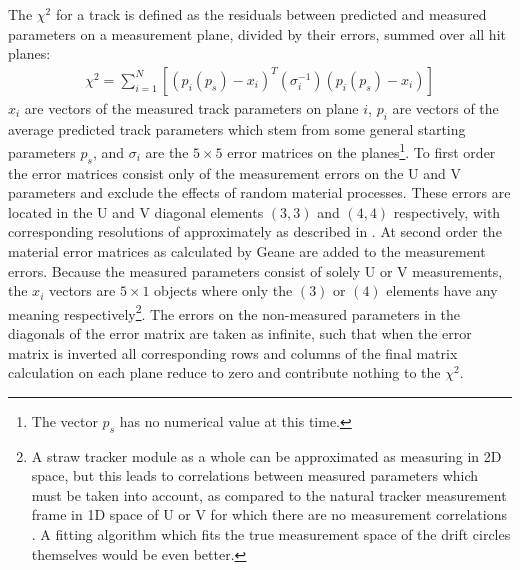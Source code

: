 The $\chi^{2}$ for a track is defined as the residuals between predicted and measured parameters on a measurement plane, divided by their errors, summed over all hit planes:
    \begin{align} \label{eq:chi2sum}
        \chi^2 = \sum_{i=1}^{N} [(p_{i}(p_{s})-x_{i})^{T} (\sigma_{i}^{-1}) (p_{i}(p_{s})-x_{i})]
    \end{align}
$x_{i}$ are vectors of the measured track parameters on plane $i$, $p_{i}$ are vectors of the average predicted track parameters which stem from some general starting parameters $p_{s}$, and $\sigma_{i}$ are the $5 \times 5$ error matrices on the planes\footnote{The vector $p_{s}$ has no numerical value at this time.}. To first order the error matrices consist only of the measurement errors on the U and V parameters and exclude the effects of random material processes. These errors are located in the U and V diagonal elements $(3,3)$ and $(4,4)$ respectively, with corresponding resolutions of approximately  as described in . At second order the material error matrices as calculated by Geane are added to the measurement errors. Because the measured parameters consist of solely U or V measurements, the $x_{i}$ vectors are $5 \times 1$ objects where only the $(3)$ or $(4)$ elements have any meaning respectively\footnote{A straw tracker module as a whole can be approximated as measuring in 2D space, but this leads to correlations between measured parameters which must be taken into account, as compared to the natural tracker measurement frame in 1D space of U or V for which there are no measurement correlations \cite{UVcorrelations}. A fitting algorithm which fits the true measurement space of the drift circles themselves would be even better.}. The errors on the non-measured parameters in the diagonals of the error matrix are taken as infinite, such that when the error matrix is inverted all corresponding rows and columns of the final matrix calculation on each plane reduce to zero and contribute nothing to the $\chi^{2}$.


